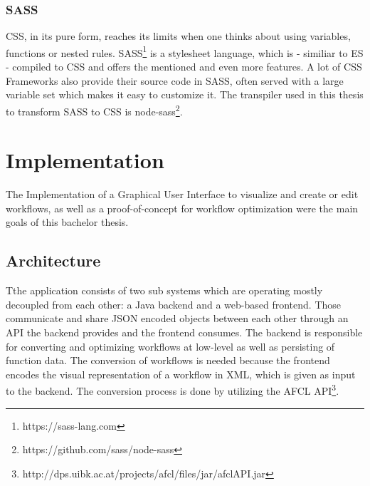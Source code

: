 \documentclass[a4paper,12pt,pdftex,halfparskip,cleardoubleempty,bibtotoc,liststotoc]{scrbook}
\begin{document}
\subsection{SASS}

CSS, in its pure form, reaches its limits when one thinks about using variables, functions or nested rules. SASS\footnote{https://sass-lang.com} is a stylesheet language, which is - similiar to ES - compiled to CSS and offers the mentioned and even more features.
A lot of CSS Frameworks also provide their source code in SASS, often served with a large variable set which makes it easy to customize it. The transpiler used in this thesis to transform SASS to CSS is node-sass\footnote{https://github.com/sass/node-sass}.


\chapter{Implementation}


The Implementation of a Graphical User Interface to visualize and create or edit workflows, as well as a proof-of-concept for workflow optimization were the main goals of this bachelor thesis.


\section{Architecture}


Tthe application  consists of two sub systems which are operating mostly decoupled from each other: a Java backend and a web-based frontend. Those communicate and share JSON encoded objects between each other through an API the backend provides and the frontend consumes. The backend is responsible for converting and optimizing workflows at low-level as well as persisting of function data. The conversion of workflows is needed because the frontend encodes the visual representation of a workflow in XML, which is given as input to the backend. The conversion process is done by utilizing the AFCL API\footnote{http://dps.uibk.ac.at/projects/afcl/files/jar/afclAPI.jar}. 
\end{document}
